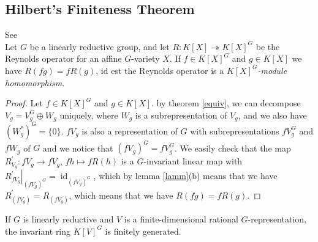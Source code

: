 \subsection{Hilbert's Finiteness Theorem}

\begin{proposition}
  See \cite[p.41 Corollary 2.2.7]{DK15}\\
  Let $G$ be a linearly reductive group, and let $ R \colon K[X] \twoheadrightarrow K[X]^G $ be the Reynolds operator for an affine $G$-variety $X$.
  If $f \in K[X]^G$ and $g \in K[X]$ we have $R(fg) = fR(g)$, id est the Reynolds operator is a \textit{$K[X]^G$-module homomorphism}.
\end{proposition}

\begin{proof}
  Let $f \in K[X]^G$ and $g \in K[X]$.
  by theorem \ref{equiv}, we can decompose $V_g = V_g^G \oplus W_g$ uniquely, where $W_g$ is a subrepresentation of $V_g$, and we also have $(W_g^\ast)^G = \{0\}$.
  $fV_g$ is also a representation of $G$ with subrepresentations $fV_g^G$ and $fW_g$ of $G$ and we notice that $(fV_g)^G = fV_g^G$.
  We easily check that the map $R_{V_g}^\prime \colon fV_g \longrightarrow fV_g$, $fh \mapsto f R(h)$ is a $G$-invariant linear map with $\left. R_{fV_g}^\prime \right|_{(fV_g)^G} = \operatorname{id}_{(fV_g)^G}$, which by lemma \ref{lamm}(b) means that we have $R_{(fV_g)}^\prime = R_{(fV_g)}$, which means that we have $R(fg) = fR(g)$.
\end{proof}


\begin{theorem}\label{hilbert}
  If $G$ is linearly reductive and $V$ is a finite-dimensional rational $G$-representation, the invariant ring $K[V]^G$ is finitely generated.
\end{theorem}

